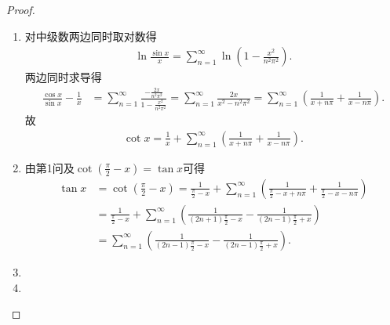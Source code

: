 \documentclass[../../main.tex]{subfiles}%
\begin{document}
\begin{proof}
\begin{enumerate}
\item 对中级数两边同时取对数得
\begin{align*}
\ln \frac{\sin x}{x} = \sum_{n=1}^{\infty} \ln \left(1 - \frac{x^2}{n^2\pi^2}\right).
\end{align*}
两边同时求导得
\begin{align*}
\frac{\cos x}{\sin x} - \frac{1}{x} &= \sum_{n=1}^{\infty} \frac{-\frac{2x}{n^2\pi^2}}{1 - \frac{x^2}{n^2\pi^2}} = \sum_{n=1}^{\infty} \frac{2x}{x^2 - n^2\pi^2} = \sum_{n=1}^{\infty} \left( \frac{1}{x + n\pi} + \frac{1}{x - n\pi} \right).
\end{align*}
故
\begin{align*}
\cot x = \frac{1}{x} + \sum_{n=1}^{\infty} \left( \frac{1}{x + n\pi} + \frac{1}{x - n\pi} \right).
\end{align*}

\item 由第1问及$\cot \left( \frac{\pi}{2}-x \right) =\tan x$可得
\begin{align*}
\tan x&=\cot \left( \frac{\pi}{2}-x \right) =\frac{1}{\frac{\pi}{2}-x}+\sum_{n=1}^{\infty}{\left( \frac{1}{\frac{\pi}{2}-x+n\pi}+\frac{1}{\frac{\pi}{2}-x-n\pi} \right)}\\
&=\frac{1}{\frac{\pi}{2}-x}+\sum_{n=1}^{\infty}{\left( \frac{1}{\left( 2n+1 \right) \frac{\pi}{2}-x}-\frac{1}{\left( 2n-1 \right) \frac{\pi}{2}+x} \right)}\\
&=\sum_{n=1}^{\infty}{\left( \frac{1}{\left( 2n-1 \right) \frac{\pi}{2}-x}-\frac{1}{\left( 2n-1 \right) \frac{\pi}{2}+x} \right)}.
\end{align*}

\item 

\item 
\end{enumerate}
\end{proof}
\end{document}
